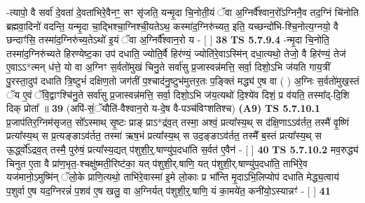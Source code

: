 \documentclass[17pt]{extarticle}
\begin{document}
                  -त्यापो॒ वै सर्वा॑ दे॒वता॑ दे॒वता॑भिरे॒वैनꣳ॒॒ सꣳ सृ॑जति॒ यन्मृ॒दा चि॒नोती॒यं ॅवा अ॒ग्निर्वै᳚श्वान॒रो᳚ऽग्निनै॒व तद॒ग्निं चि॑नोति ब्रह्मवा॒दिनो॑ वदन्ति॒ यन्मृ॒दा चा॒द्भिश्चा॒ग्निश्ची॒यतेऽथ॒ कस्मा॑द॒ग्निरु॑च्यत॒ इति॒ यच्छन्दो॑भि-श्चि॒नोत्य॒ग्नयो॒ वै छन्दाꣳ॑सि॒ तस्मा॑द॒ग्निरु॑च्य॒तेऽथो॑ इ॒यं ॅवा अ॒ग्निर्वै᳚श्वान॒रो य - [  ] \textbf{  38} \newline
                  \newline
                                \textbf{ TS 5.7.9.4} \newline
                  -न्मृ॒दा चि॒नोति॒ तस्मा॑द॒ग्निरु॑च्यते हिरण्येष्ट॒का उप॑ दधाति॒ ज्योति॒र्वै हिर॑ण्यं॒ ज्योति॑रे॒वाऽस्मि॑न् दधा॒त्यथो॒ तेजो॒ वै हिर॑ण्यं॒ तेज॑ ए॒वाऽऽ*त्मन् ध॑त्ते॒ यो वा अ॒ग्निꣳ स॒र्वतो॑मुखं चिनु॒ते सर्वा॑सु प्र॒जास्वन्न॑मत्ति॒ सर्वा॒ दिशो॒ऽभि ज॑यति गाय॒त्रीं पु॒रस्ता॒दुप॑ दधाति त्रि॒ष्टुभं॑ दक्षिण॒तो जग॑तीं प॒श्चाद॑नु॒ष्टुभ॑मुत्तर॒तः प॒ङ्क्तिं मद्ध्य॑ ए॒ष वा ( ) अ॒ग्निः स॒र्वतो॑मुख॒स्तं ॅय ए॒वं ॅवि॒द्वाꣳश्चि॑नु॒ते सर्वा॑सु प्र॒जास्वन्न॑मत्ति॒ सर्वा॒ दिशो॒ऽभि ज॑य॒त्यथो॑ दि॒श्ये॑व दिशं॒ प्र व॑यति॒ तस्मा᳚द्-दि॒शि दिक् प्रोता᳚ ॥ \textbf{  39 } \newline
                  \newline
                      (अपि॑-सं॒ॅयौति॑-वैश्वान॒रो य-दे॒ष वै-पञ्च॑विꣳशतिश्च)  \textbf{(A9)} \newline \newline
                                        \textbf{ TS 5.7.10.1} \newline
                  प्र॒जाप॑तिर॒ग्निम॑सृजत॒ सो᳚ऽस्माथ् सृ॒ष्टः प्राङ् प्राऽ*द्र॑व॒त् तस्मा॒ अश्वं॒ प्रत्या᳚स्य॒थ् स द॑क्षि॒णाऽऽव॑र्तत॒ तस्मै॑ वृ॒ष्णिं प्रत्या᳚स्य॒थ् स प्र॒त्यङ्ङाऽव॑र्तत॒ तस्मा॑ ऋष॒भं प्रत्या᳚स्य॒थ् स उद॒ङ्ङाऽव॑र्तत॒ तस्मै᳚ ब॒स्तं प्रत्या᳚स्य॒थ् स ऊ॒र्द्ध्वो᳚ऽद्रव॒त् तस्मै॒ पुरु॑षं॒ प्रत्या᳚स्य॒द्यत् प॑शुशी॒र्॒.षाण्यु॑प॒दधा॑ति स॒र्वत॑ ए॒वैन॑ - [  ] \textbf{  40} \newline
                  \newline
                                \textbf{ TS 5.7.10.2} \newline
                  मव॒रुद्ध्य॑ चिनुत ए॒ता वै प्रा॑ण॒भृत॒-श्चक्षु॑ष्मती॒रिष्ट॑का॒ यत् प॑शुशी॒र्.षाणि॒ यत् प॑शुशी॒र्.षाण्यु॑प॒दधा॑ति॒ ताभि॑रे॒व यज॑मानो॒ऽमुष्मि॑न् ॅलो॒के प्राणि॒त्यथो॒ ताभि॑रे॒वास्मा॑ इ॒मे लो॒काः प्र भा᳚न्ति मृ॒दाऽभि॒लिप्योप॑ दधाति मेद्ध्य॒त्वाय॑ प॒शुर्वा ए॒ष यद॒ग्निरन्नं॑ प॒शव॑ ए॒ष खलु॒ वा अ॒ग्निर्यत् प॑शुशी॒र्॒.षाणि॒ यं का॒मये॑त॒ कनी॑यो॒ऽस्यान्नꣳ॑ - [  ] \textbf{  41} \newline
                  \newline
\end{document}
